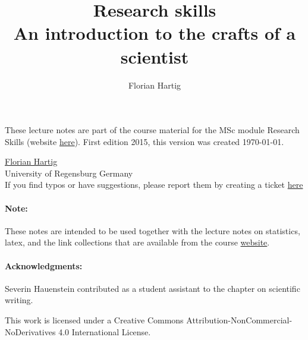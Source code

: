 \documentclass{tufte-book}
\title{Research skills\\
\large{An introduction to the crafts of a scientist}}
\author{Florian Hartig}
\begin{document}
\let\cleardoublepage\clearpage
\maketitle


\thispagestyle{empty}
\null

\begin{fullwidth}
These lecture notes are part of the course material for the MSc module Research Skills (website \href{http://florianhartig.github.io/ResearchSkills/}{here}). First edition 2015, this version was created \today.\\[0.5cm]
\end{fullwidth}

\href{http://www.uni-regensburg.de/biologie-vorklinische-medizin/theoretische-oekologie/mitarbeiter/hartig/index.html}{Florian Hartig}\\
University of Regensburg
Germany\\[0.2cm]
If you find typos or have suggestions, please report them by creating a ticket \href{https://github.com/florianhartig/ResearchSkills/issues}{here}

\paragraph{Note:} These notes are intended to be used together with the lecture notes on statistics, latex, and the link collections that are available from the course \href{https://florianhartig.github.io/Statistics/}{website}.


\paragraph{Acknowledgments:} Severin Hauenstein contributed as a student assistant to the chapter on scientific writing.


\vfill
\begin{fullwidth}
This work is licensed under a Creative Commons Attribution-NonCommercial-NoDerivatives 4.0 International License.
\end{fullwidth}


\newpage
\tableofcontents

\newpage



\end{document}
